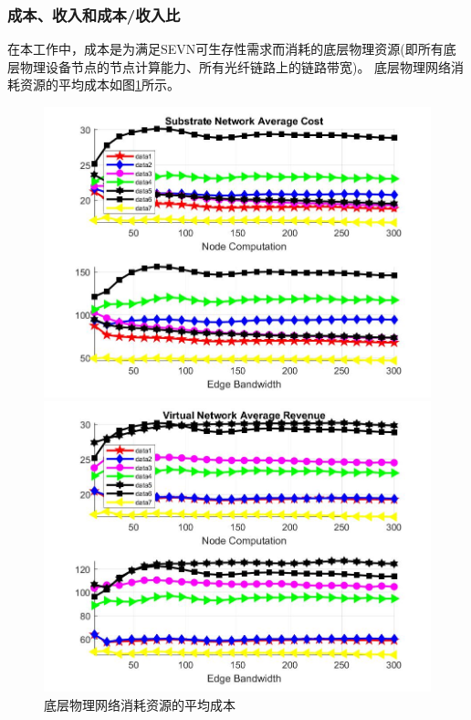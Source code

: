 \subsubsection{成本、收入和成本/收入比}
在本工作中，成本是为满足SEVN可生存性需求而消耗的底层物理资源(即所有底层物理设备节点的节点计算能力、所有光纤链路上的链路带宽)。
底层物理网络消耗资源的平均成本如图\ref{fig:CostAccumulateAverageSubstrateNetwork}所示。
\begin{figure}[htbp]
\centering
\begin{minipage}{0.4\textwidth}
\centering
\includegraphics[width=\textwidth]{figures/CostAccumulateAverageSubstrateNetwork}
\caption{底层物理网络消耗资源的平均成本}\label{fig:CostAccumulateAverageSubstrateNetwork}
\end{minipage}
\begin{minipage}{0.4\textwidth}
\centering
\includegraphics[width=\textwidth]{figures/RevenueAccumulateAverageVirtualNetwork}

\end{minipage}
\end{figure}
